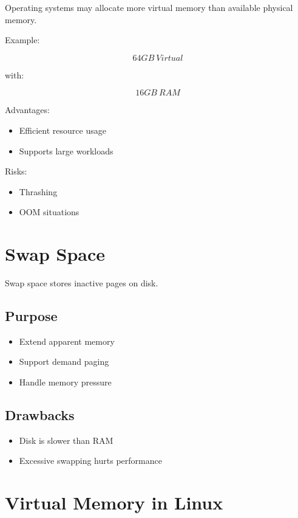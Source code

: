 Operating systems may allocate more virtual memory than available physical memory.

Example:

\[
64GB\ Virtual
\]

with:

\[
16GB\ RAM
\]

Advantages:

\begin{itemize}
\item Efficient resource usage
\item Supports large workloads
\end{itemize}

Risks:

\begin{itemize}
\item Thrashing
\item OOM situations
\end{itemize}

\section{Swap Space}

Swap space stores inactive pages on disk.

\subsection{Purpose}

\begin{itemize}
\item Extend apparent memory
\item Support demand paging
\item Handle memory pressure
\end{itemize}

\subsection{Drawbacks}

\begin{itemize}
\item Disk is slower than RAM
\item Excessive swapping hurts performance
\end{itemize}

\section{Virtual Memory in Linux}

